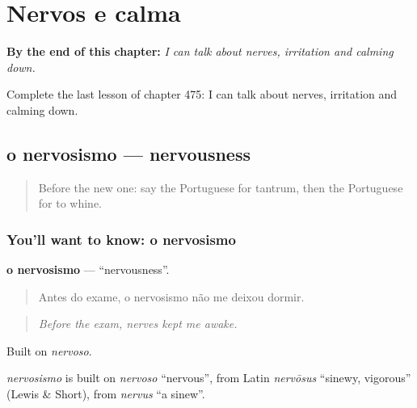 
\chapter{Nervos e calma}
\label{ch:pt-nervos-e-calma}

\begin{chapteropening}
\textbf{By the end of this chapter:} \emph{I can talk about nerves, irritation and calming down.}

Complete the last lesson of chapter 475: I can talk about nerves, irritation and calming down.
\end{chapteropening}

\section[o nervosismo]{o nervosismo — nervousness}

\label{lesson:PT-C475-nervosismo}



\begin{quote}
Before the new one: say the Portuguese for tantrum, then the Portuguese for to whine.
\end{quote}

\subsection*{You'll want to know: o nervosismo}
\textbf{o nervosismo} — \textquotedblleft{}nervousness\textquotedblright{}.

\begin{quote}
Antes do exame, o nervosismo não me deixou dormir.
\end{quote}

\begin{quote}
\emph{Before the exam, nerves kept me awake.}
\end{quote}

Built on \emph{nervoso}.

\begin{cousinweb}
\emph{nervosismo} is built on \emph{nervoso} \textquotedblleft{}nervous\textquotedblright{}, from Latin \emph{nervōsus} \textquotedblleft{}sinewy, vigorous\textquotedblright{} (Lewis \& Short), from \emph{nervus} \textquotedblleft{}a sinew\textquotedblright{}.
\end{cousinweb}

